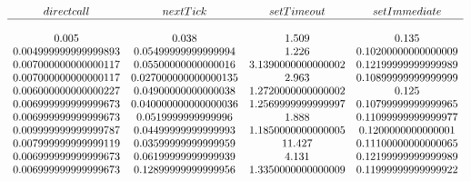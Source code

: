 \[\begin{array}{cccc}
direct call & nextTick & setTimeout & setImmediate \\
\hline \\
0.005 & 0.038 & 1.509 & 0.135 \\
0.004999999999999893 & 0.05499999999999994 & 1.226 & 0.10200000000000009 \\
0.007000000000000117 & 0.05500000000000016 & 3.1390000000000002 & 0.12199999999999989 \\
0.007000000000000117 & 0.027000000000000135 & 2.963 & 0.10899999999999999 \\
0.006000000000000227 & 0.04900000000000038 & 1.2720000000000002 & 0.125 \\
0.006999999999999673 & 0.040000000000000036 & 1.2569999999999997 & 0.10799999999999965 \\
0.006999999999999673 & 0.0519999999999996 & 1.888 & 0.11099999999999977 \\
0.009999999999999787 & 0.04499999999999993 & 1.1850000000000005 & 0.1200000000000001 \\
0.007999999999999119 & 0.03599999999999959 & 11.427 & 0.11100000000000065 \\
0.006999999999999673 & 0.06199999999999939 & 4.131 & 0.12199999999999989 \\
0.006999999999999673 & 0.12899999999999956 & 1.3350000000000009 & 0.11999999999999922\\
\end{array}\]
